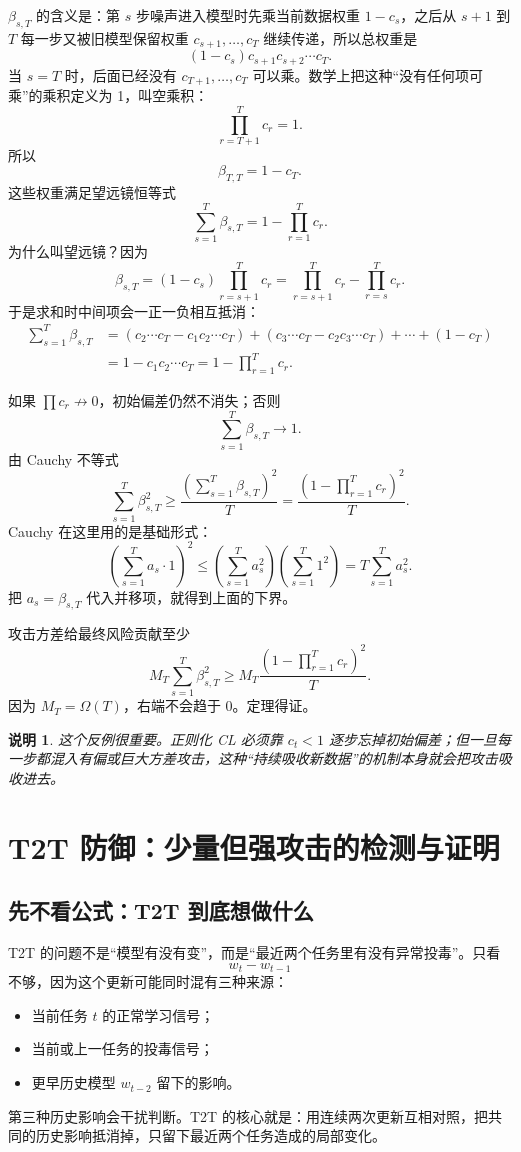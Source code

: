 \documentclass[UTF8,fontset=none,11pt]{ctexart}
\theoremstyle{cnstyle}
\newtheorem{remark}[theorem]{说明}
\begin{document}
\(\beta_{s,T}\) 的含义是：第 \(s\) 步噪声进入模型时先乘当前数据权重 \(1-c_s\)，之后从 \(s+1\) 到 \(T\) 每一步又被旧模型保留权重 \(c_{s+1},\dots,c_T\) 继续传递，所以总权重是
\[
  (1-c_s)c_{s+1}c_{s+2}\cdots c_T.
\]
当 \(s=T\) 时，后面已经没有 \(c_{T+1},\dots,c_T\) 可以乘。数学上把这种“没有任何项可乘”的乘积定义为 1，叫空乘积：
\[
  \prod_{r=T+1}^Tc_r=1.
\]
所以
\[
  \beta_{T,T}=1-c_T.
\]
这些权重满足望远镜恒等式
\[
  \sum_{s=1}^T\beta_{s,T}
  =
  1-\prod_{r=1}^Tc_r .
\]
为什么叫望远镜？因为
\[
  \beta_{s,T}
  =
  (1-c_s)\prod_{r=s+1}^Tc_r
  =
  \prod_{r=s+1}^Tc_r-\prod_{r=s}^Tc_r.
\]
于是求和时中间项会一正一负相互抵消：
\begin{align*}
  \sum_{s=1}^T\beta_{s,T}
  &=
  (c_2\cdots c_T-c_1c_2\cdots c_T)
  +(c_3\cdots c_T-c_2c_3\cdots c_T)
  +\cdots
  +(1-c_T)\\
  &=
  1-c_1c_2\cdots c_T
  =
  1-\prod_{r=1}^Tc_r.
\end{align*}

如果 \(\prod c_r\not\to0\)，初始偏差仍然不消失；否则
\[
  \sum_{s=1}^T\beta_{s,T}\to1 .
\]
由 Cauchy 不等式
\[
  \sum_{s=1}^T\beta_{s,T}^2
  \ge
  \frac{\left(\sum_{s=1}^T\beta_{s,T}\right)^2}{T}
  =
  \frac{(1-\prod_{r=1}^Tc_r)^2}{T}.
\]
Cauchy 在这里用的是基础形式：
\[
  \left(\sum_{s=1}^T a_s\cdot 1\right)^2
  \le
  \left(\sum_{s=1}^T a_s^2\right)
  \left(\sum_{s=1}^T 1^2\right)
  =
  T\sum_{s=1}^T a_s^2.
\]
把 \(a_s=\beta_{s,T}\) 代入并移项，就得到上面的下界。

攻击方差给最终风险贡献至少
\[
  M_T\sum_{s=1}^T\beta_{s,T}^2
  \ge
  M_T\frac{(1-\prod_{r=1}^Tc_r)^2}{T}.
\]
因为 \(M_T=\Omega(T)\)，右端不会趋于 0。定理得证。

\begin{remark}
这个反例很重要。正则化 CL 必须靠 \(c_t<1\) 逐步忘掉初始偏差；但一旦每一步都混入有偏或巨大方差攻击，这种“持续吸收新数据”的机制本身就会把攻击吸收进去。
\end{remark}

\section{T2T 防御：少量但强攻击的检测与证明}

\subsection{先不看公式：T2T 到底想做什么}

T2T 的问题不是“模型有没有变”，而是“最近两个任务里有没有异常投毒”。只看
\[
  w_t-w_{t-1}
\]
不够，因为这个更新可能同时混有三种来源：
\begin{itemize}
  \item 当前任务 \(t\) 的正常学习信号；
  \item 当前或上一任务的投毒信号；
  \item 更早历史模型 \(w_{t-2}\) 留下的影响。
\end{itemize}
第三种历史影响会干扰判断。T2T 的核心就是：用连续两次更新互相对照，把共同的历史影响抵消掉，只留下最近两个任务造成的局部变化。
\end{document}
